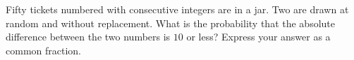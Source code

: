 Fifty tickets numbered with consecutive integers are in a jar. Two are drawn at random and without replacement. What is the probability that the absolute difference between the two numbers is $10$ or less? Express your answer as a common fraction.
